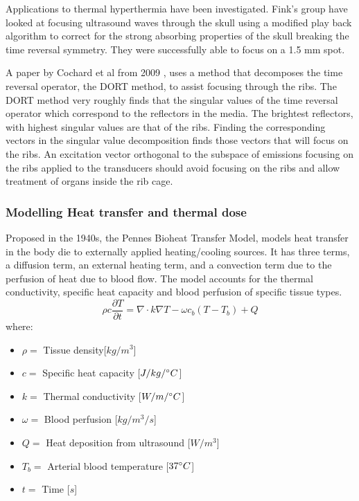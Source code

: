 \documentclass[11pt]{article} %
\begin{document}
\begin{itemize}
		Applications to thermal hyperthermia have been investigated. Fink's group have looked at focusing ultrasound waves through the skull using a modified play back algorithm to correct for the strong absorbing properties of the skull breaking the time reversal symmetry. They were successfully able to focus on a 1.5 mm spot. 
		
		A paper by Cochard et al from 2009 \cite{Cochard2009}, uses a method that decomposes the time reversal operator, the DORT method, to assist focusing through the ribs. The DORT method very roughly finds that the singular values of the time reversal operator  which correspond to the reflectors in the media. The brightest reflectors, with highest singular values are that of the ribs. Finding the corresponding vectors in the singular value decomposition finds those vectors that will focus on the ribs. An excitation vector orthogonal to the subspace of emissions focusing on the ribs applied to the transducers should avoid focusing on the ribs and allow treatment of organs inside the rib cage. 
		
	
	\end{itemize}
	
		
		
	
	\subsubsection{Modelling Heat transfer and thermal dose}
	

	Proposed in the 1940s, the Pennes Bioheat Transfer Model, \cite{Pennes1948} models heat transfer in the body die to externally applied heating/cooling sources. It has three terms, a diffusion term, an external heating term, and a convection term due to the perfusion of heat due to blood flow. The model accounts for the thermal conductivity, specific heat capacity and blood perfusion of specific tissue types. 
	\begin{equation}
		\boxed{\rho c \frac{\partial T}{\partial t}= \nabla\cdot k \nabla T-\omega c_b (T-T_b)+Q}
	\end{equation}
	where:
	
	\begin{itemize}
		\item $ \rho = $ Tissue density[$ kg/m^3 $]
		\item  $ c= $ Specific heat capacity [$ J/kg/\degree C  $]
		\item $ k= $ Thermal conductivity  [$ W/m/\degree C $]
		\item $ \omega = $ Blood perfusion [$ kg/m^3/s $]
		\item $ Q= $ Heat deposition from ultrasound $ [W/m^3 $]
		\item $ T_b= $ Arterial blood temperature [$ 37\degree C $]
		\item $ t= $ Time [$ s $]
	\end{itemize}
	
\end{document}

